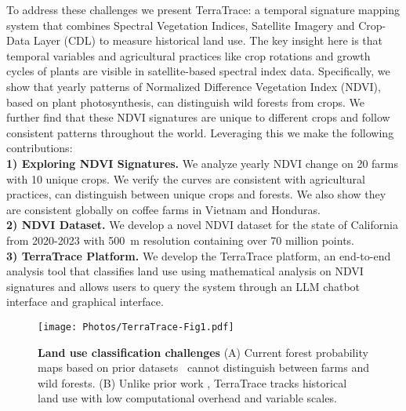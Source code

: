 To address these challenges we present TerraTrace: a temporal signature mapping system that combines Spectral Vegetation Indices, Satellite Imagery and Crop-Data Layer (CDL) \cite{montero,CropScape} to measure historical land use. The key insight here is that temporal variables and agricultural practices like crop rotations and growth cycles of plants are visible in satellite-based spectral index data. Specifically, we show that yearly patterns of Normalized Difference Vegetation Index (NDVI), based on plant photosynthesis, can distinguish wild forests from crops. We further find that these NDVI signatures are unique to different crops and follow consistent patterns throughout the world. Leveraging this we make the following contributions: \\
\textbf{1) Exploring NDVI Signatures.} We analyze yearly NDVI change on 20 farms with 10 unique crops. We verify the curves are consistent with agricultural practices, can distinguish between unique crops and forests. We also show they are consistent globally on coffee farms in Vietnam and Honduras. \\
\textbf{2) NDVI Dataset.} We develop a novel NDVI dataset for the state of California from 2020-2023 with 500~m resolution containing over 70 million points. \\
\textbf{3) TerraTrace Platform.} We develop the TerraTrace platform, an end-to-end analysis tool that classifies land use using mathematical analysis on NDVI signatures and allows users to query the system through an LLM chatbot interface and graphical interface.



\begin{figure}[t]
    \centering
    \texttt{[image: Photos/TerraTrace-Fig1.pdf]}
    \vspace{-0.6cm} 
    \caption{\textbf{Land use classification challenges} (A) Current forest probability maps based on prior datasets~\cite{ALOS-paper, pittman2019global} cannot distinguish between farms and wild forests. (B) Unlike prior work \cite{presto} \cite{wstatt}, TerraTrace tracks historical land use with low computational overhead and variable scales.}
    \label{fig:Fig1}
    \vspace{-0.3cm} 
\end{figure}